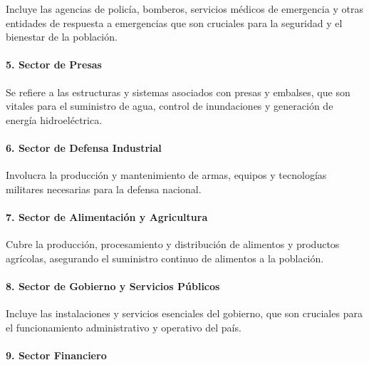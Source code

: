 \documentclass{article}
\begin{document}
Incluye las agencias de policía, bomberos, servicios médicos de
emergencia y otras entidades de respuesta a emergencias que son
cruciales para la seguridad y el bienestar de la población.

\hypertarget{sector-de-presas}{%
\paragraph{\texorpdfstring{5. \textbf{Sector de
Presas}}{5. Sector de Presas}}\label{sector-de-presas}}

Se refiere a las estructuras y sistemas asociados con presas y embalses,
que son vitales para el suministro de agua, control de inundaciones y
generación de energía hidroeléctrica.

\hypertarget{sector-de-defensa-industrial}{%
\paragraph{\texorpdfstring{6. \textbf{Sector de Defensa
Industrial}}{6. Sector de Defensa Industrial}}\label{sector-de-defensa-industrial}}

Involucra la producción y mantenimiento de armas, equipos y tecnologías
militares necesarias para la defensa nacional.

\hypertarget{sector-de-alimentaciuxf3n-y-agricultura}{%
\paragraph{\texorpdfstring{7. \textbf{Sector de Alimentación y
Agricultura}}{7. Sector de Alimentación y Agricultura}}\label{sector-de-alimentaciuxf3n-y-agricultura}}

Cubre la producción, procesamiento y distribución de alimentos y
productos agrícolas, asegurando el suministro continuo de alimentos a la
población.

\hypertarget{sector-de-gobierno-y-servicios-puxfablicos}{%
\paragraph{\texorpdfstring{8. \textbf{Sector de Gobierno y Servicios
Públicos}}{8. Sector de Gobierno y Servicios Públicos}}\label{sector-de-gobierno-y-servicios-puxfablicos}}

Incluye las instalaciones y servicios esenciales del gobierno, que son
cruciales para el funcionamiento administrativo y operativo del país.

\hypertarget{sector-financiero}{%
\paragraph{\texorpdfstring{9. \textbf{Sector
Financiero}}{9. Sector Financiero}}\label{sector-financiero}}
\end{document}
